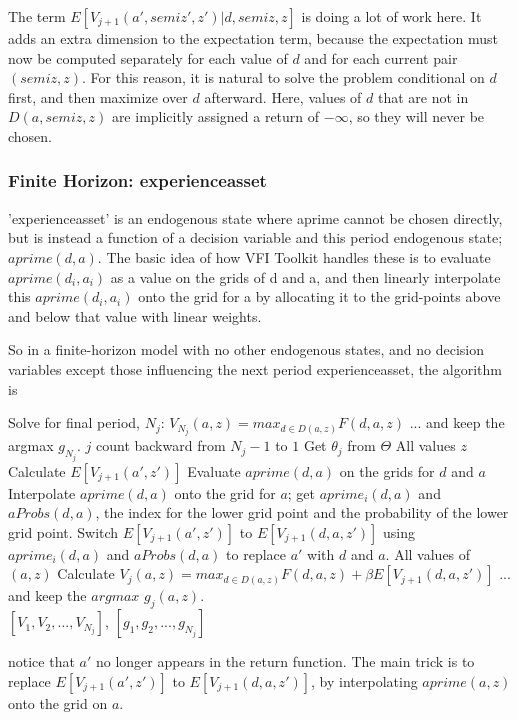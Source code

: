 The term $E[V_{j+1}(a',semiz',z')|d,semiz,z]$ is doing a lot of work here. It adds an extra dimension to the expectation term, because the expectation must now be computed separately for each value of $d$ and for each current pair $(semiz,z)$. For this reason, it is natural to solve the problem conditional on $d$ first, and then maximize over $d$ afterward. Here, values of $d$ that are not in $D(a,semiz,z)$ are implicitly assigned a return of $-\infty$, so they will never be chosen.


\subsubsection{Finite Horizon: experienceasset}
'experienceasset' is an endogenous state where aprime cannot be chosen directly, but is instead a function of a decision variable and this period endogenous state; $aprime(d,a)$. The basic idea of how VFI Toolkit handles these is to evaluate $aprime(d_i,a_i)$ as a value on the grids of d and a, and then linearly interpolate this $aprime(d_i,a_i)$ onto the grid for a by allocating it to the grid-points above and below that value with linear weights.

So in a finite-horizon model with no other endogenous states, and no decision variables except those influencing the next period experienceasset, the algorithm is
\begin{algorithmic}
 \State Solve for final period, $N_j$: $V_{N_j}(a,z)=max_{d\in D(a,z)} F(d,a,z)$
 \State ... and keep the argmax $g_{N_j}$.
 \For $j$ count backward from $N_j-1$ to $1$
   \State Get $\theta_j$ from $\Theta$
   \For All values $z$
    \State Calculate $E[V_{j+1}(a',z')]$
    \State Evaluate $aprime(d,a)$ on the grids for $d$ and $a$
    \State Interpolate $aprime(d,a)$ onto the grid for $a$; get $aprime_i(d,a)$ and $aProbs(d,a)$, the index for the lower grid point and the probability of the lower grid point.
    \State Switch $E[V_{j+1}(a',z')]$ to $E[V_{j+1}(d,a,z')]$ using $aprime_i(d,a)$ and $aProbs(d,a)$ to replace $a'$ with $d$ and $a$.
    \For All values of $(a,z)$
     \State Calculate $V_j(a,z)=max_{d \in D(a,z)} F(d,a,z)+\beta E[V_{j+1}(d,a,z')]$
     \State ... and keep the $argmax$ $g_j(a,z)$.
     \EndFor
   \EndFor
  \EndFor
   \\ \Return $[V_1,V_2,...,V_{N_j}]$, $[g_1,g_2,...,g_{N_j}]$
\end{algorithmic}
notice that $a'$ no longer appears in the return function. The main trick is to replace $E[V_{j+1}(a',z')]$ to $E[V_{j+1}(d,a,z')]$, by interpolating $aprime(a,z)$ onto the grid on $a$.

